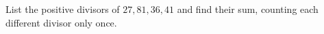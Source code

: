 List the positive divisors of $27,81,36,41$ and find their sum, counting each different divisor only once.
